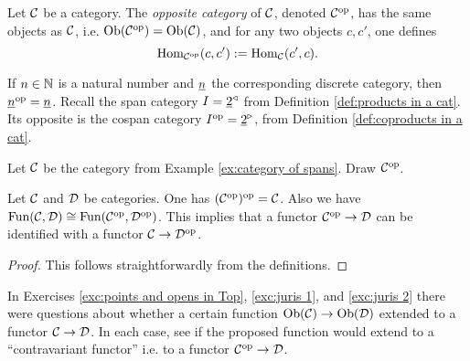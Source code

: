 \begin{definition}

Let $\mathcal{C}$ be a category. The {\em opposite category} of $\mathcal{C}$, denoted $\mathcal{C}^\textnormal{op}$, has the same objects as $\mathcal{C}$, i.e. $\textnormal{Ob}(\mathcal{C}^\textnormal{op})=\textnormal{Ob}(\mathcal{C})$, and for any two objects $c,c'$, one defines
$$\textnormal{Hom}_{\mathcal{C}^\textnormal{op}}(c,c'):=\textnormal{Hom}_\mathcal{C}(c',c).$$

\end{definition}

\begin{example}

If $n\in{\mathbb N}$ is a natural number and $\underline{n}$ the corresponding discrete category, then $\underline{n}^\textnormal{op}=\underline{n}$. Recall  the span category $I=\underline{2}^\triangleleft$ from Definition \ref{def:products in a cat}. Its opposite is the cospan category $I^\textnormal{op}=\underline{2}^\triangleright$, from Definition \ref{def:coproducts in a cat}.

\end{example}

\begin{exercise}
Let $\mathcal{C}$ be the category from Example \ref{ex:category of spans}. Draw $\mathcal{C}^\textnormal{op}$.
\end{exercise}

\begin{lemma}

Let $\mathcal{C}$ and $\mathcal{D}$ be categories. One has $(\mathcal{C}^\textnormal{op})^\textnormal{op}=\mathcal{C}$. Also we have $\textnormal{Fun}(\mathcal{C},\mathcal{D})\cong\textnormal{Fun}(\mathcal{C}^\textnormal{op},\mathcal{D}^\textnormal{op})$. This implies that a functor $\mathcal{C}^\textnormal{op}\rightarrow\mathcal{D}$ can be identified with a functor $\mathcal{C}\rightarrow\mathcal{D}^\textnormal{op}$.

\end{lemma}

\begin{proof}

This follows straightforwardly from the definitions.

\end{proof}

\begin{exercise}
In Exercises \ref{exc:points and opens in Top}, \ref{exc:juris 1}, and \ref{exc:juris 2} there were questions about whether a certain function $\textnormal{Ob}(\mathcal{C})\rightarrow\textnormal{Ob}(\mathcal{D})$ extended to a functor $\mathcal{C}\rightarrow\mathcal{D}$. In each case, see if the proposed function would extend to a “contravariant functor” i.e. to a functor $\mathcal{C}^\textnormal{op}\rightarrow\mathcal{D}$.
\end{exercise}

